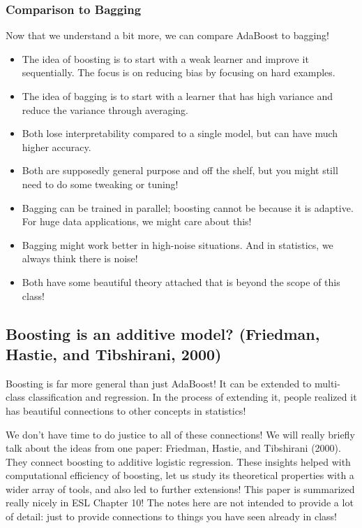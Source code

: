 \subsubsection{Comparison to Bagging}

Now that we understand a bit more, we can compare AdaBoost to bagging!
\begin{itemize}
\item The idea of boosting is to start with a weak learner and improve it sequentially. The focus is on reducing bias by focusing on hard examples. 
\item The idea of bagging is to start with a learner that has high variance and reduce the variance through averaging. 
\item Both lose interpretability compared to a single model, but can have much higher accuracy.
\item Both are supposedly general purpose and off the shelf, but you might still need to do some tweaking or tuning!
\item Bagging can be trained in parallel; boosting cannot be because it is adaptive. For huge data applications, we might care about this!
\item Bagging might work better in high-noise situations. And in statistics, we always think there is noise!
\item Both have some beautiful theory attached that is beyond the scope of this class!
\end{itemize}

\subsection{Boosting is an additive model? (Friedman, Hastie, and Tibshirani, 2000)}

Boosting is far more general than just AdaBoost! It can be extended to multi-class classification and regression. In the process of extending it, people realized it has beautiful connections to other concepts in statistics! %

We don't have time to do justice to all of these connections! We will really briefly talk about the ideas from one paper: Friedman, Hastie, and Tibshirani  (2000). They connect boosting to additive logistic regression. These insights helped with computational efficiency of boosting, let us study its theoretical properties with a wider array of tools, and also led to further extensions! This paper is summarized really nicely in ESL Chapter 10! The notes here are not intended to provide a lot of detail: just to provide connections to things you have seen already in class!

